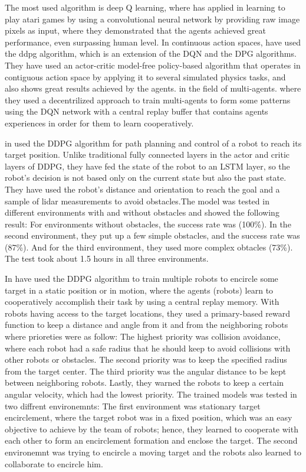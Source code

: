 \documentclass[12pt]{extarticle}
\begin{document}
The most used algorithm is deep Q learning, where \cite{mnih2013playing} has applied  in learning to play atari games by using a convolutional neural network by providing raw image pixels as input, where they demonstrated that the agents achieved great performance, even surpassing human level.
In continuous action spaces, \cite{lillicrap2015continuous} have used the ddpg algorithm, which is an extension of the DQN and the DPG algorithms. They have used an actor-critic model-free policy-based algorithm that operates in contiguous action space by applying it to several simulated physics tasks, and also shows great results achieved by the agents.
in the field of multi-agents. \cite{diallo2020multi} where they used a decentrilized approach to train multi-agents to form some patterns using the DQN network with a central replay buffer that contains agents experiences in order for them to learn cooperatively.


in \cite{gong2022efficient} used the DDPG algorithm for path planning and control of a robot to reach its target position. Unlike traditional fully connected layers in the actor and critic layers of DDPG, they have fed the state of the robot to an LSTM layer, so the robot's decision is not based only on the current state but also the past state. They have used the robot's distance and orientation to reach the goal and a sample of lidar measurements to avoid obstacles.The model was tested in different environments with and without obstacles and showed the following result:
For environments without obstacles, the success rate was (100\%). In the second environment, they put up a few simple obstacles, and the success rate was (87\%). And for the third environment, they used more complex obtacles (73\%). The test took about 1.5 hours in all three environments.



In \cite{ma2020multi} have used the DDPG algorithm to train multiple robots to encircle some target in a static position or in motion, where the agents (robots) learn to cooperatively accomplish their task by using a central replay memory. With robots having access to the target locations, they used a primary-based reward function to keep a distance and angle from it and from the neighboring robots where prioreties were as follow:
The highest priority was collision avoidance, where each robot had a safe radius that he should keep to avoid collisions with other robots or obstacles. The second priority was to keep the specified radius from the target center. The third priority was the angular distance to be kept between neighboring robots. Lastly, they warned the robots to keep a certain angular velocity, which had the lowest priority. The trained models was tested in two diffrent environemnts:
The first environment was stationary target encirclement, where the target robot was in a fixed position, which was an easy objective to achieve by the team of robots; hence, they learned to cooperate with each other to form an encirclement formation and enclose the target. The second environemnt  was trying to encircle a moving target and the robots also learned to collaborate to encircle him.
\end{document}
